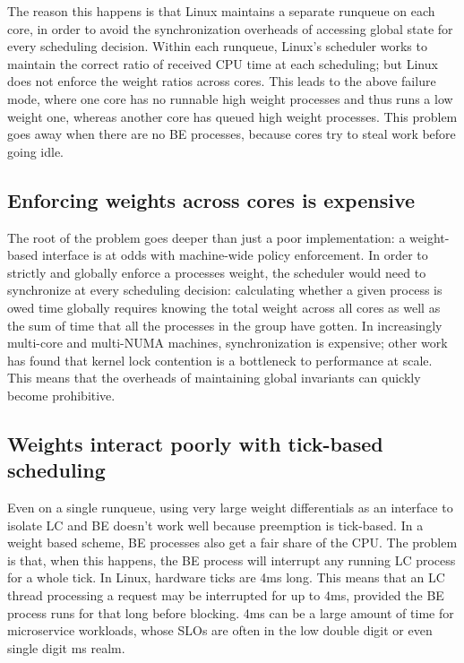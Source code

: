 The reason this happens is that Linux maintains a separate runqueue on each
core, in order to avoid the synchronization overheads of accessing global state
for every scheduling decision. Within each runqueue, Linux's scheduler works to
maintain the correct ratio of received CPU time at each scheduling; but Linux
does not enforce the weight ratios across cores. This leads to the above failure
mode, where one core has no runnable high weight processes and thus runs a low
weight one, whereas another core has queued high weight processes. This problem
goes away when there are no BE processes, because cores try to steal work before
going idle.

\subsection{Enforcing weights across cores is
expensive}\label{ss:problem:cross-core-hard}

The root of the problem goes deeper than just a poor implementation: a
weight-based interface is at odds with machine-wide policy enforcement. In order
to strictly and globally enforce a processes weight, the scheduler would need to
synchronize at every scheduling decision: calculating whether a given process is
owed time globally requires knowing the total weight across all cores as well as
the sum of time that all the processes in the group have gotten. In increasingly
multi-core and multi-NUMA machines, synchronization is expensive; other work has
found that kernel lock contention is a bottleneck to performance at
scale.~\cite{TODO} This means that the overheads of maintaining global invariants
can quickly become prohibitive.


\subsection{Weights interact poorly with tick-based
scheduling}\label{ss:problem:quantum}

Even on a single runqueue, using very large weight differentials as an interface
to isolate LC and BE doesn't work well because preemption is tick-based. In a
weight based scheme, BE processes also get a fair share of the CPU. The problem
is that, when this happens, the BE process will interrupt any running LC process
for a whole tick. In Linux, hardware ticks are 4ms long. This means that an LC
thread processing a request may be interrupted for up to 4ms, provided the BE
process runs for that long before blocking. 4ms can be a large amount of time
for microservice workloads, whose SLOs are often in the low double digit or even
single digit ms realm.~\cite{TODO}



